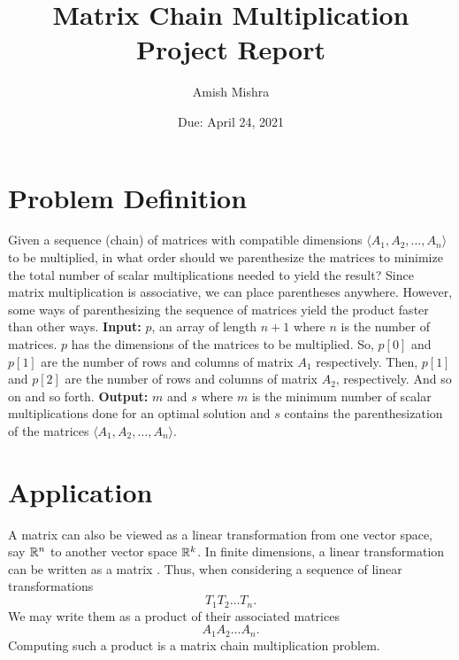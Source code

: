 \documentclass[letterpaper,titlepage]{article}
\title{Matrix Chain Multiplication Project Report}
\author{Amish Mishra}
\date{Due: April 24, 2021}
\begin{document}
\maketitle

\section{Problem Definition}\label{def}
Given a sequence (chain) of matrices with compatible dimensions $\langle A_1,A_2, \dots, A_n\rangle$ to be multiplied, in what order should we parenthesize the matrices to minimize the total number of scalar multiplications needed to yield the result? Since matrix multiplication is associative, we can place parentheses anywhere. However, some ways of parenthesizing the sequence of matrices yield the product faster than other ways.
\newline
\newline
\textbf{Input:} $p$, an array of length $n+1$ where $n$ is the number of matrices. $p$ has the dimensions of the matrices to be multiplied. So, $p[0]$ and $p[1]$ are the number of rows and columns of matrix $A_1$ respectively. Then, $p[1]$ and $p[2]$ are the number of rows and columns of matrix $A_2$, respectively. And so on and so forth.
\newline
\textbf{Output:} $m$ and $s$ where $m$ is the minimum number of scalar multiplications done for an optimal solution and $s$ contains the parenthesization of the matrices $\langle A_1,A_2, \dots, A_n\rangle$.

\section{Application}
A matrix can also be viewed as a linear transformation from one vector space, say $\mathbb{R}^n$ to another vector space $\mathbb{R}^k$. In finite dimensions, a linear transformation can be written as a matrix \cite{Chen}. Thus, when considering a sequence of linear transformations
    $$T_1T_2\dots T_n.$$
We may write them as a product of their associated matrices
    $$A_1A_2\dots A_n.$$
Computing such a product is a matrix chain multiplication problem.
\end{document}
